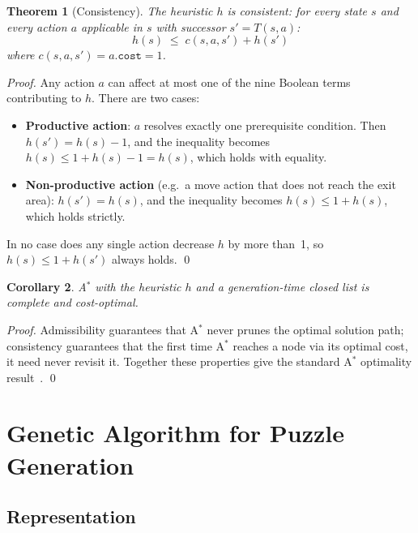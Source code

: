 \documentclass[12pt, a4paper]{report}
\newtheorem{theorem}{Theorem}[chapter]
\newtheorem{corollary}[theorem]{Corollary}
\begin{document}
\begin{theorem}[Consistency]
The heuristic $h$ is consistent: for every state $s$ and every action $a$
applicable in $s$ with successor $s' = T(s,a)$:
\[
  h(s) \;\leq\; c(s, a, s') + h(s')
\]
where $c(s, a, s') = a.\texttt{cost} = 1$.
\end{theorem}

\begin{proof}
Any action $a$ can affect at most one of the nine Boolean terms contributing to
$h$.  There are two cases:

\begin{itemize}[leftmargin=1.5em]
  \item \textbf{Productive action}: $a$ resolves exactly one prerequisite
        condition.  Then $h(s') = h(s) - 1$, and the inequality becomes
        $h(s) \leq 1 + h(s) - 1 = h(s)$, which holds with equality.
  \item \textbf{Non-productive action} (e.g.\ a move action that does not
        reach the exit area): $h(s') = h(s)$, and the inequality becomes
        $h(s) \leq 1 + h(s)$, which holds strictly.
\end{itemize}

In no case does any single action decrease $h$ by more than~1, so
$h(s) \leq 1 + h(s')$ always holds. \qed
\end{proof}

\begin{corollary}
A$^{\ast}$ with the heuristic $h$ and a generation-time closed list is complete
and cost-optimal.
\end{corollary}

\begin{proof}
Admissibility guarantees that A$^{\ast}$ never prunes the optimal solution
path; consistency guarantees that the first time A$^{\ast}$ reaches a node via
its optimal cost, it need never revisit it.  Together these properties give the
standard A$^{\ast}$ optimality result~\cite{hart1968formal,russell2020ai}.
\qed
\end{proof}

\section{Genetic Algorithm for Puzzle Generation}
\label{sec:ga}

\subsection{Representation}
\end{document}
